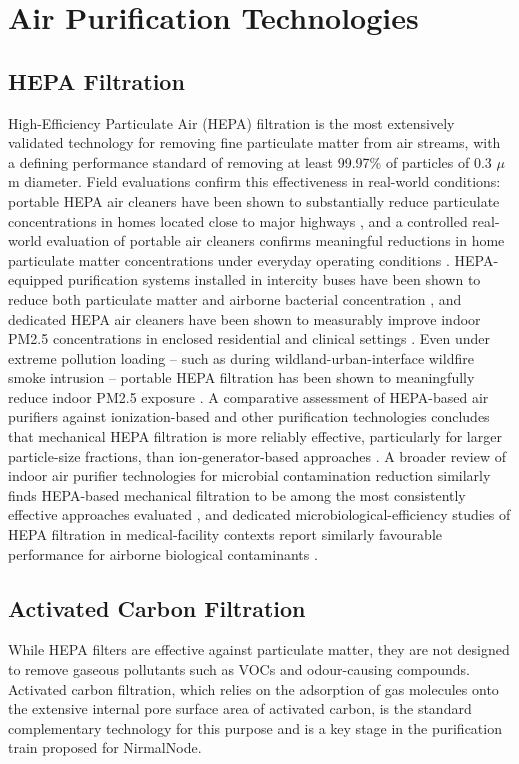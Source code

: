 \section{Air Purification Technologies}
\label{sec:lr-purification}

\subsection{HEPA Filtration}
High-Efficiency Particulate Air (HEPA) filtration is the most extensively validated technology for removing fine particulate matter from air streams, with a defining performance standard of removing at least 99.97\% of particles of 0.3 $\mu$m diameter. Field evaluations confirm this effectiveness in real-world conditions: portable HEPA air cleaners have been shown to substantially reduce particulate concentrations in homes located close to major highways \citep{cox2018effectiveness}, and a controlled real-world evaluation of portable air cleaners confirms meaningful reductions in home particulate matter concentrations under everyday operating conditions \citep{lu2023realworld}. HEPA-equipped purification systems installed in intercity buses have been shown to reduce both particulate matter and airborne bacterial concentration \citep{lee2022effect}, and dedicated HEPA air cleaners have been shown to measurably improve indoor PM2.5 concentrations in enclosed residential and clinical settings \citep{chen2022efficacy}. Even under extreme pollution loading -- such as during wildland-urban-interface wildfire smoke intrusion -- portable HEPA filtration has been shown to meaningfully reduce indoor PM2.5 exposure \citep{chen2025fine}. A comparative assessment of HEPA-based air purifiers against ionization-based and other purification technologies concludes that mechanical HEPA filtration is more reliably effective, particularly for larger particle-size fractions, than ion-generator-based approaches \citep{dubey2021assessing}. A broader review of indoor air purifier technologies for microbial contamination reduction similarly finds HEPA-based mechanical filtration to be among the most consistently effective approaches evaluated \citep{szczotko2022review}, and dedicated microbiological-efficiency studies of HEPA filtration in medical-facility contexts report similarly favourable performance for airborne biological contaminants \citep{laine2025microbiological}.

\subsection{Activated Carbon Filtration}
While HEPA filters are effective against particulate matter, they are not designed to remove gaseous pollutants such as VOCs and odour-causing compounds. Activated carbon filtration, which relies on the adsorption of gas molecules onto the extensive internal pore surface area of activated carbon, is the standard complementary technology for this purpose and is a key stage in the purification train proposed for NirmalNode.

